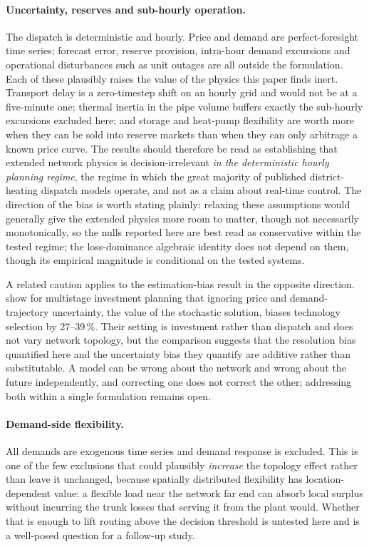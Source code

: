 
\paragraph{Uncertainty, reserves and sub-hourly operation.}
The dispatch is deterministic and hourly. Price and demand are perfect-foresight time
series; forecast error, reserve provision, intra-hour demand excursions and operational
disturbances such as unit outages are all outside the formulation. Each of these plausibly
raises the value of the physics this paper finds inert. Transport delay is a zero-timestep
shift on an hourly grid and would not be at a five-minute one; thermal inertia in the pipe
volume buffers exactly the sub-hourly excursions excluded here; and storage and heat-pump
flexibility are worth more when they can be sold into reserve markets than when they can
only arbitrage a known price curve. The results should therefore be read as establishing
that extended network physics is decision-irrelevant \emph{in the deterministic hourly
planning regime}, the regime in which the great majority of published district-heating
dispatch models operate, and not as a claim about real-time control. The direction of
the bias is worth stating plainly: relaxing these assumptions would generally give the
extended physics more room to matter, though not necessarily monotonically, so the nulls
reported here are best read as conservative within the tested regime; the loss-dominance
algebraic identity does not depend on them, though its empirical magnitude is conditional on
the tested systems.

A related caution applies to the estimation-bias result in the opposite direction.
\citet{Koek2026} show for multistage investment planning that ignoring price and
demand-trajectory uncertainty, the value of the stochastic solution, biases technology
selection by 27--39\,\%. Their setting is investment rather than dispatch and does not
vary network topology, but the comparison suggests that the resolution bias quantified
here and the uncertainty bias they quantify are additive rather than substitutable. A
model can be wrong about the network and wrong about the future independently, and
correcting one does not correct the other; addressing both within a single formulation
remains open.

\paragraph{Demand-side flexibility.}
All demands are exogenous time series and demand response is excluded. This is one of the
few exclusions that could plausibly \emph{increase} the topology effect rather than leave
it unchanged, because spatially distributed flexibility has location-dependent value: a
flexible load near the network far end can absorb local surplus without incurring the
trunk losses that serving it from the plant would. Whether that is enough to lift routing
above the decision threshold is untested here and is a well-posed question for a follow-up
study.

